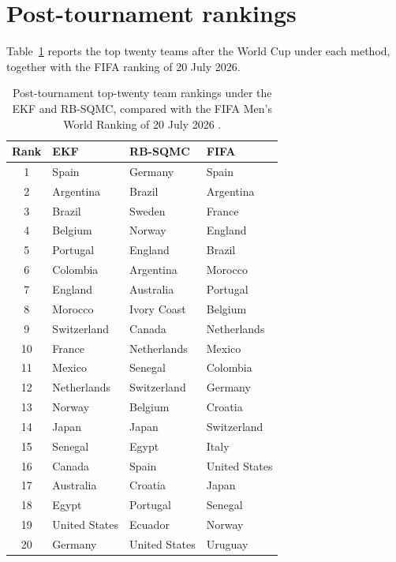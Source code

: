 \section{Post-tournament rankings}

Table~\ref{tab:rankings-post} reports the top twenty teams after the World Cup under each method, together with the FIFA ranking of 20 July 2026.

\begin{table}[H]
\centering
\begin{tabular}{clll}
\toprule
Rank & EKF & RB-SQMC & FIFA \\
\midrule
1 & Spain & Germany & Spain \\
2 & Argentina & Brazil & Argentina \\
3 & Brazil & Sweden & France \\
4 & Belgium & Norway & England \\
5 & Portugal & England & Brazil \\
6 & Colombia & Argentina & Morocco \\
7 & England & Australia & Portugal \\
8 & Morocco & Ivory Coast & Belgium \\
9 & Switzerland & Canada & Netherlands \\
10 & France & Netherlands & Mexico \\
11 & Mexico & Senegal & Colombia \\
12 & Netherlands & Switzerland & Germany \\
13 & Norway & Belgium & Croatia \\
14 & Japan & Japan & Switzerland \\
15 & Senegal & Egypt & Italy \\
16 & Canada & Spain & United States \\
17 & Australia & Croatia & Japan \\
18 & Egypt & Portugal & Senegal \\
19 & United States & Ecuador & Norway \\
20 & Germany & United States & Uruguay \\
\bottomrule
\end{tabular}
\caption{Post-tournament top-twenty team rankings under the EKF and RB-SQMC, compared with the FIFA Men's World Ranking of 20 July 2026 \citep{fifaworldranking2026}.}
\label{tab:rankings-post}
\end{table}
